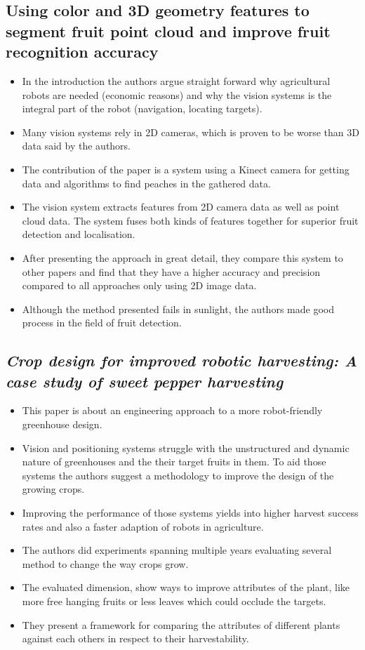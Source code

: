 \documentclass{article}
\begin{document}
\subsection*{Using color and 3D geometry features to segment fruit point cloud and improve fruit recognition accuracy}
\cite{Wu2020}

\begin{itemize}
  \item In the introduction the authors argue straight forward why agricultural robots are needed (economic reasons) and why the vision systems is the integral part of the robot (navigation, locating targets).
  \item Many vision systems rely in 2D cameras, which is proven to be worse than 3D data said by the authors.
  \item The contribution of the paper is a system using a Kinect camera for getting data and algorithms to find peaches in the gathered  data.
  \item The vision system extracts features from 2D camera data as well as point cloud data. The system fuses both kinds of features together for superior fruit detection and localisation.
  \item After presenting the approach in great detail, they compare this system to other papers and find that they have a higher accuracy and precision compared to all approaches only using 2D image data.
  \item Although the method presented fails in sunlight, the authors made good process in the field of fruit detection.
\end{itemize}

\subsection*{\emph{Crop design for improved robotic harvesting: A case study of sweet pepper harvesting}}
\cite{Herck2020}

\begin{itemize}
  \item This paper is about an engineering approach to a more robot-friendly greenhouse design.
  \item Vision and positioning systems struggle with the unstructured and dynamic nature of greenhouses and the their target fruits in them. To aid those systems the authors suggest a methodology to improve the design of the growing crops.
  \item Improving the performance of those systems yields into higher harvest success rates and also a faster adaption of robots in agriculture.
  \item The authors did experiments spanning multiple years evaluating several method to change the way crops grow. 
  \item The evaluated dimension, show ways to improve attributes of the plant, like more free hanging fruits or less leaves which could occlude the targets.
  \item They present a framework for comparing the attributes of different plants against each others in respect to their harvestability.
\end{itemize}
\end{document}
